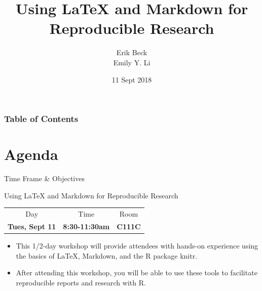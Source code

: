 \documentclass{beamer}
\title{Using LaTeX and Markdown for Reproducible Research}
\subtitle{}
\author{Erik Beck \\ Emily Y. Li}
\institute{2018 US EPA \\ R User Group Workshop}
\date{11 Sept 2018}
\begin{document}
    \begin{frame}
        \maketitle
    \end{frame}

    \begin{frame}
        \frametitle{Table of Contents}
        \tableofcontents
    \end{frame}

\section{Agenda}

\begin{frame}{Time Frame \& Objectives}
\begin{exampleblock}{Using LaTeX and Markdown for Reproducible Research}
\begin{center}
    \begin{tabular}{c c c}
    Day & Time & Room \\
    \textbf{Tues, Sept 11} & \textbf{8:30-11:30am} & \textbf{C111C}
\end{tabular}
\end{center}
\end{exampleblock}

\begin{itemize}
    \item This 1/2-day workshop will provide attendees with hands-on experience
using the basics of LaTeX, Markdown, and the R package knitr.
    \item After attending this workshop, you will be able to use these tools to
facilitate reproducible reports and research with R.
\end{itemize}
\end{frame}
\end{document}
